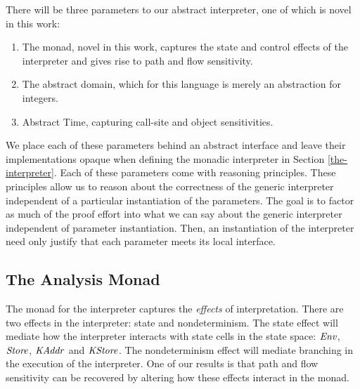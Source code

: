 \par

There will be three parameters to our abstract interpreter, one of which
is novel in this work:

\par

\begin{enumerate}
\def\labelenumi{\arabic{enumi}.}
\itemsep1pt\parskip0pt
\item
  The monad, novel in this work, captures the state and control effects
  of the interpreter and gives rise to path and flow sensitivity.
\item
  The abstract domain, which for this language is merely an abstraction
  for integers.
\item
  Abstract Time, capturing call-site and object sensitivities.
\end{enumerate}

\par

We place each of these parameters behind an abstract interface and leave
their implementations opaque when defining the monadic interpreter in
Section \ref{the-interpreter}. Each of these parameters come with
reasoning principles. These principles allow us to reason about the
correctness of the generic interpreter independent of a particular
instantiation of the parameters. The goal is to factor as much of the
proof effort into what we can say about the generic interpreter
independent of parameter instantiation. Then, an instantiation of the
interpreter need only justify that each parameter meets its local
interface.

\par

\subsection{The Analysis Monad}\label{the-analysis-monad}

\par

The monad for the interpreter captures the \emph{effects} of
interpretation. There are two effects in the interpreter: state and
nondeterminism. The state effect will mediate how the interpreter
interacts with state cells in the state space: $ \operatorname{\mathit{Env}} $,
$ \operatorname{\mathit{Store}} $, $ \operatorname{\mathit{KAddr}} $ and $ \operatorname{\mathit{KStore}} $. The
nondeterminism effect will mediate branching in the execution of the
interpreter. One of our results is that path and flow sensitivity can be
recovered by altering how these effects interact in the monad.

